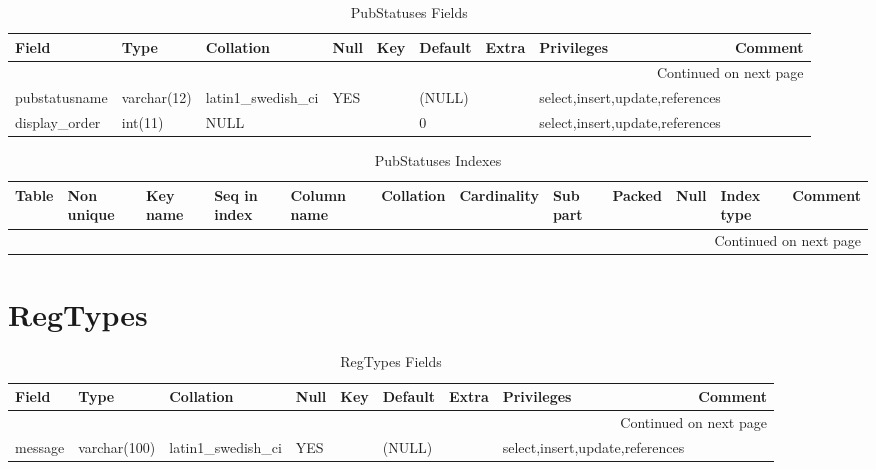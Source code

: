 \documentclass[tablesignature,landscape]{scrartcl}
\begin{document}
\begin{longtable}{|l|l|l|l|l|l|l|l|l|}
\caption{PubStatuses Fields} \label{tbl:pubsttausesfields}\\
\hline
 Field             &  Type         &  Collation                &  Null  &  Key  &  Default  &  Extra              &  Privileges                       &  Comment \\
\hline
\endhead
\hline\multicolumn{9}{r}{Continued on next page}\
\endfoot
\endlastfoot
\hline
 pubstatusid       &  int(11)      &  NULL                     &        &  PRI  &  (NULL)   &  auto\_{}increment  &  select,insert,update,references  &           \\
 pubstatusname     &  varchar(12)  &  latin1\_{}swedish\_{}ci  &  YES   &       &  (NULL)   &                     &  select,insert,update,references  &           \\
 display\_{}order  &  int(11)      &  NULL                     &        &       &  0        &                     &  select,insert,update,references  &           \\
\hline
\end{longtable}


\begin{longtable}{|l|l|l|l|l|l|l|l|l|l|l|l|}
\caption{PubStatuses Indexes} \label{tbl:pubstatusesindexes}\\
\hline
 Table        &  Non unique  &  Key name  &  Seq in index  &  Column name  &  Collation  &  Cardinality  &  Sub part  &  Packed  &  Null  &  Index type  &  Comment \\
\hline
\endhead
\hline\multicolumn{12}{r}{Continued on next page}\
\endfoot
\endlastfoot
\hline
 PubStatuses  &           0  &  PRIMARY   &             1  &  pubstatusid  &  A          &            3  &  (NULL)    &  (NULL)  &        &  BTREE       &           \\
\hline
\end{longtable}
\section{RegTypes}
\label{sec-19}


\begin{longtable}{|l|l|l|l|l|l|l|l|l|}
\caption{RegTypes Fields} \label{tbl:regtypesfields}\\
\hline
 Field    &  Type          &  Collation                &  Null  &  Key  &  Default  &  Extra  &  Privileges                       &  Comment \\
\hline
\endhead
\hline\multicolumn{9}{r}{Continued on next page}\
\endfoot
\endlastfoot
\hline
 regtype  &  varchar(40)   &  latin1\_{}swedish\_{}ci  &        &  PRI  &           &         &  select,insert,update,references  &           \\
 message  &  varchar(100)  &  latin1\_{}swedish\_{}ci  &  YES   &       &  (NULL)   &         &  select,insert,update,references  &           \\
\hline
\end{longtable}
\end{document}
